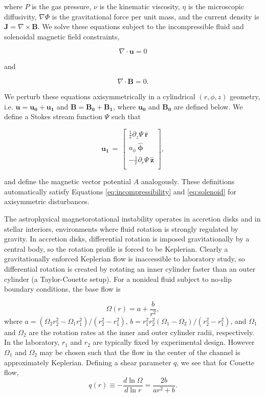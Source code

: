 \documentclass[onecolumn]{emulateapj}
\newcommand{\beq}{\begin{equation}}
\newcommand{\eeq}{\end{equation}}
\newcommand{\uphi}{\ensuremath{u_\phi}}
\newcommand{\rhat}{\ensuremath{\mathbf{\hat{r}}}}
\newcommand{\phihat}{\ensuremath{\mathbf{\hat{\phi}}}}
\newcommand{\zhat}{\ensuremath{\mathbf{\hat{z}}}}
\begin{document}
where $P$ is the gas pressure, $\nu$ is the kinematic viscosity, $\eta$ is the microscopic diffusivity, $\nabla\Phi$ is the gravitational force per unit mass, and the current density is $\mathbf{J} = \nabla\times\mathbf{B}$. We solve these equations subject to the incompressible fluid and solenoidal magnetic field constraints,

\beq
\label{eq:incompressibility}
\nabla \cdot \mathbf{u} = 0
\eeq

and 

\beq
\label{eq:solenoid}
\nabla \cdot \mathbf{B} = 0.
\eeq

We perturb these equations axisymmetrically in a cylindrical $(r, \phi, z)$ geometry, i.e. $\mathbf{u} = \mathbf{u_0} + \mathbf{u_1}$ and $\mathbf{B} = \mathbf{B_0} + \mathbf{B_1}$, where $\mathbf{u_0}$ and $\mathbf{B_0}$ are defined below. We define a Stokes stream function $\Psi$ such that 

\beq
  \label{eq:stokes}
  \mathbf{u_1} \, = \, \left[\begin{matrix}
\frac{1}{r} \partial_z \Psi\ \rhat\\
\uphi \ \phihat\\
-\frac{1}{r} \partial_r \Psi\ \zhat\\
\end{matrix}\right],
\eeq

and define the magnetic vector potential $A$ analogously. These definitions automatically satisfy Equations \ref{eq:incompressibility} and \ref{eq:solenoid} for axisymmetric disturbances. 

The astrophysical magnetorotational instability operates in accretion disks and in stellar interiors, environments where fluid rotation is strongly regulated by gravity. In accretion disks, differential rotation is imposed gravitationally by a central body, so the rotation profile is forced to be Keplerian. Clearly a gravitationally enforced Keplerian flow is inaccessible to laboratory study, so differential rotation is created by rotating an inner cylinder faster than an outer cylinder (a Taylor-Couette setup). For a nonideal fluid subject to no-slip boundary conditions, the base flow is

\begin{equation}
  \label{eq:couette_flow}
  \Omega(r) = a + \frac{b}{r^2},
\end{equation}
where $a = (\Omega_2 r^2_2 - \Omega_1 r^2_1)/(r^2_2 - r^2_1)$, $b = r^2_1 r^2_2 (\Omega_1 - \Omega_2)/(r^2_2 - r^2_1)$, and $\Omega_1$ and $\Omega_2$ are the rotation rates at the inner and outer cylinder radii, respectively. In the laboratory, $r_1$ and $r_2$ are typically fixed by experimental design. However $\Omega_1$ and $\Omega_2$ may be chosen such that the flow in the center of the channel is approximately Keplerian. Defining a shear parameter $q$, we see that for Couette flow,
\begin{equation}
  \label{eq:couette_q}
  q(r) \equiv -\frac{d \ln \Omega}{d \ln r} = \frac{2 b}{a r^2 + b}.
\end{equation}
\end{document}
